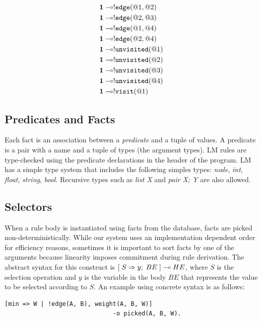 \nopagebreak

\begin{align}
\mathbf{1} \multimap & {!} \mathtt{edge}(@1, @2) \\
\mathbf{1} \multimap & {!} \mathtt{edge}(@2, @3) \\
\mathbf{1} \multimap & {!} \mathtt{edge}(@1, @4) \\
\mathbf{1} \multimap & {!} \mathtt{edge}(@2, @4) \\
\mathbf{1} \multimap & {!} \mathtt{unvisited}(@1)  \\
\mathbf{1} \multimap & {!} \mathtt{unvisited}(@2) \\
\mathbf{1} \multimap & {!} \mathtt{unvisited}(@3) \\
\mathbf{1} \multimap & {!} \mathtt{unvisited}(@4) \\
\mathbf{1} \multimap & {!} \mathtt{visit}(@1)
\end{align}

\subsection{Predicates and Facts}

Each fact is an association between a \emph{predicate} and a tuple of values. A
predicate is a pair with a name and a tuple of types (the argument types). LM
rules are type-checked using the predicate declarations in the header of the
program. LM has a simple type system that includes the following simples types:
\emph{node}, \emph{int}, \emph{float}, \emph{string}, \emph{bool}. Recursive
types such as \emph{list X} and \emph{pair X; Y} are also allowed.

\subsection{Selectors}

When a rule body is instantiated using facts from the database, facts are picked
non-deterministically. While our system uses an implementation dependent order
for efficiency reasons, sometimes it is important to sort facts by one of the
arguments because linearity imposes commitment during rule derivation. The
abstract syntax for this construct is $[\; S \Rightarrow y; \; BE \;] \multimap HE$, where $S$ is
the selection operation and $y$ is the variable in the body $BE$ that represents
the value to be selected according to $S$. An example using concrete syntax is
as follows:

{\small
\begin{Verbatim}
[min => W | !edge(A, B), weight(A, B, W)]
                              -o picked(A, B, W).
\end{Verbatim}
}

